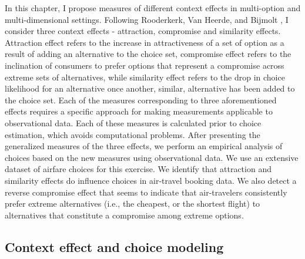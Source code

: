 \documentclass[a4paper,12pt]{article}
\newcommand{\citeyearonly}[1]{\citeyearpar{#1}}
\begin{document}
In this chapter, I propose measures of different context effects in multi-option and multi-dimensional settings. Following Rooderkerk, Van Heerde, and Bijmolt \citeyearonly{roodrkerkEtAl11}, I consider three context effects - attraction, compromise and similarity effects. Attraction effect refers to the increase in attractiveness of a set of option as a result of adding an alternative to the choice set, compromise effect refers to the inclination of consumers to prefer options that represent a compromise across extreme sets of alternatives, while similarity effect refers to the drop in choice likelihood for an alternative once another, similar, alternative has been added to the choice set. Each of the measures corresponding to three aforementioned effects requires a specific approach for making measurements applicable to observational data. Each of these measures is calculated prior to choice estimation, which avoids computational problems. After presenting the generalized measures of the three effects, we perform an empirical analysis of choices based on the new measures using observational data. We use an extensive dataset of airfare choices for this exercise. We identify that attraction and similarity effects do influence choices in air-travel booking data. We also detect a reverse compromise effect that seems to indicate that air-travelers consistently prefer extreme alternatives (i.e., the cheapest, or the shortest flight) to alternatives that constitute a compromise among extreme options.

\subsection{Context effect and choice modeling}
\end{document}
